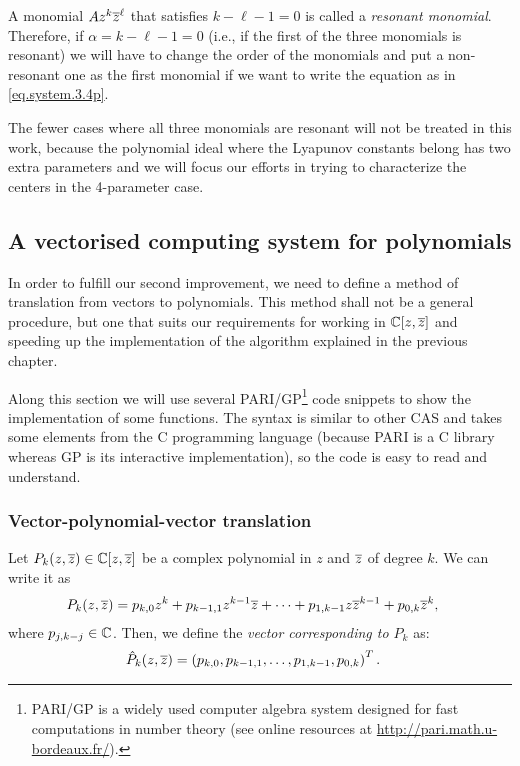 A monomial $Az^k\overline{z}^\ell$ that satisfies $k-\ell-1=0$ is called a \emph{resonant monomial}. Therefore, if $\alpha=k-\ell-1=0$ (i.e., if the first of the three monomials is resonant) we will have to change the order of the monomials and put a non-resonant one as the first monomial if we want to write the equation as in \eqref{eq.system.3.4p}.

\begin{observacio}
The fewer cases where all three monomials are resonant will not be treated in this work, because the polynomial ideal where the Lyapunov constants belong has two extra parameters and we will focus our efforts in trying to characterize the centers in the 4-parameter case.
\end{observacio}





\subsection{A vectorised computing system for polynomials}
\label{sec.pol2vec}
In order to fulfill our second improvement, we need to define a method of translation from vectors to polynomials. This method shall not be a general procedure, but one that suits our requirements for working in $\mathbb{C}[z,\overline{z}]$ and speeding up the implementation of the algorithm explained in the previous chapter.

Along this section we will use several PARI/GP\footnote{PARI/GP is a widely used computer algebra system designed for fast computations in number theory (see online resources at \url{http://pari.math.u-bordeaux.fr/}).} code snippets to show the implementation of some functions. The syntax is similar to other CAS and takes some elements from the C programming language (because PARI is a C library whereas GP is its interactive implementation), so the code is easy to read and understand.


\subsubsection{Vector-polynomial-vector translation}

\begin{definicio}
\label{def.pol2vec}
Let $P_k(z,\overline{z})\in\mathbb{C}[z,\overline{z}]$ be a complex polynomial in $z$ and $\overline{z}$ of degree $k$. We can write it as
\begin{align*}
P_k(z,\overline{z})&=p_{k,0}z^k+p_{k-1,1}z^{k-1}\overline{z}+\cdots+p_{1,k-1}z\overline{z}^{k-1}+p_{0,k}\overline{z}^k,
\end{align*}
where $p_{j,k-j}\in\mathbb{C}$. Then, we define the \emph{vector corresponding to $P_k$} as:
\begin{align}
\hat P_k(z,\overline{z})&=\left(p_{k,0},p_{k-1,1},\dots,p_{1,k-1},p_{0,k}\right)^T.
\end{align}
\end{definicio}

